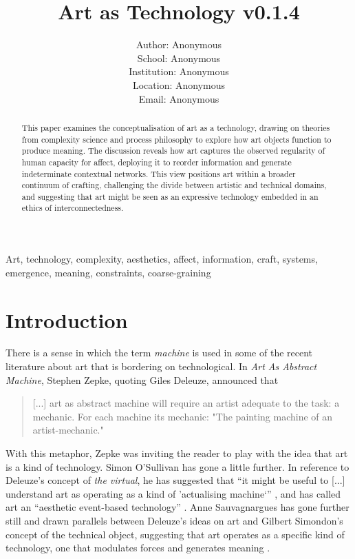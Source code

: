 \documentclass[letterpaper]{article}
\title{Art as Technology v0.1.4}
\author{Author: Anonymous\\
School: Anonymous\\
Institution: Anonymous\\
Location: Anonymous\\
Email: Anonymous\\
\newline
\newline
}
\begin{document}
 
\maketitle
\begin{abstract}

This paper examines the conceptualisation of art as a technology, drawing on theories from complexity science and process philosophy to explore how art objects function to produce meaning. The discussion reveals how art captures the observed regularity of human capacity for affect, deploying it to reorder information and generate indeterminate contextual networks. This view positions art within a broader continuum of crafting, challenging the divide between artistic and technical domains, and suggesting that art might be seen as an expressive technology embedded in an ethics of interconnectedness.
\end{abstract}


Art, technology, complexity, aesthetics, affect, information, craft, systems, emergence, meaning, constraints, coarse-graining

\section{Introduction}

    There is a sense in which the term \emph{machine} is used in some of the recent literature about art that is bordering on technological. In \emph{Art As Abstract Machine}, Stephen Zepke, quoting Giles Deleuze, announced that 

    \begin{quote}
        [...] art as abstract machine will require an artist adequate to the task: a mechanic. For each machine its mechanic: "The painting machine of an artist-mechanic." \citep[p.1]{ZepkeArtAsAbstrctMchn2005}
    \end{quote}

    With this metaphor, Zepke was inviting the reader to play with the idea that art is a kind of technology. Simon O'Sullivan has gone a little further. In reference to Deleuze's concept of \emph{the virtual}, he has suggested that “it might be useful to [...] understand art as operating as a kind of ’actualising machine‘” \citep[p.200]{ZepkeOSullivanDlzCntmprryArt2010}, and has called art an “aesthetic event-based technology” \citep[p.202]{ZepkeOSullivanDlzCntmprryArt2010}. Anne Sauvagnargues has gone further still and drawn parallels between Deleuze’s ideas on art and Gilbert Simondon’s concept of the technical object, suggesting that art operates as a specific kind of technology, one that modulates forces and generates meaning \citep[pp.74-75]{SauvagnarguesArtmchns2016}.
\end{document}
